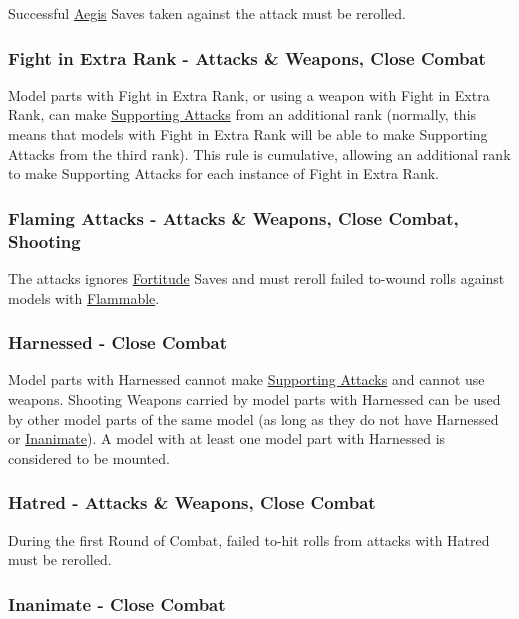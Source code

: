 Successful \hyperref[aegis]{Aegis} Saves taken against the attack must be rerolled.

\subsubsection{Fight in Extra Rank - Attacks \&{} Weapons, Close Combat}
\label{fight_in_extra_rank}

Model parts with Fight in Extra Rank, or using a weapon with Fight in Extra Rank, can make \hyperref[supporting_attacks]{Supporting Attacks} from an additional rank (normally, this means that models with Fight in Extra Rank will be able to make Supporting Attacks from the third rank). This rule is cumulative, allowing an additional rank to make Supporting Attacks for each instance of Fight in Extra Rank.

\subsubsection{Flaming Attacks - Attacks \&{} Weapons, Close Combat, Shooting}
\label{flaming_attacks}

The attacks ignores \hyperref[fortitude]{Fortitude} Saves and must reroll failed to-wound rolls against models with \hyperref[flammable]{Flammable}.

\subsubsection{Harnessed - Close Combat}
\label{harnessed}

Model parts with Harnessed cannot make \hyperref[supporting_attacks]{Supporting Attacks} and cannot use weapons. Shooting Weapons carried by model parts with Harnessed can be used by other model parts of the same model (as long as they do not have Harnessed or \hyperref[inanimate]{Inanimate}). A model with at least one model part with Harnessed is considered to be mounted.

\subsubsection{Hatred - Attacks \&{} Weapons, Close Combat}
\label{hatred}

During the first Round of Combat, failed to-hit rolls from attacks with Hatred must be rerolled.

\subsubsection{Inanimate - Close Combat}
\label{inanimate}

